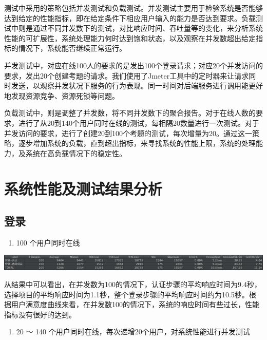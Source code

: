 \documentclass[hyperref, a4paper]{ctexart}
\providecommand{\tightlist}{%
  \setlength{\itemsep}{0pt}\setlength{\parskip}{0pt}}
\begin{document}
测试中采用的策略包括并发测试和负载测试。并发测试主要用于检验系统是否能够达到给定的性能指标，即在给定条件下相应用户输入的能力是否达到要求。负载测试中则是通过不同并发数下的测试，对比响应时间、吞吐量等的变化，来分析系统性能的可扩展性，系统处理能力何时达到饱和状态，以及观察在并发数超出给定指标的情况下，系统能否继续正常运行。

并发测试中，对应在线100人的要求的是发出100个登录请求；对应20个并发访问的要求，发出20个创建考题的请求。我们使用了Jmeter工具中的定时器来让请求同时发送，以观察并发状况下服务的行为表现。同一时间对后端服务进行调用能更好地发现资源竞争、资源死锁等问题。

负载测试中，则是调整了并发数，将不同并发数下的聚合报告。对于在线人数的要求，进行了从20到140个用户同时在线的测试，每相隔20数量进行一次测试。对于并发访问的要求，进行了创建20到100个考题的测试，每次增量为20。通过这一策略，逐步增加系统的负载，直到超出指标，来寻找系统的性能上限，系统的处理能力，及系统在高负载情况下的稳定性。

\hypertarget{ux7cfbux7edfux6027ux80fdux53caux6d4bux8bd5ux7ed3ux679cux5206ux6790}{%
\section{系统性能及测试结果分析}\label{ux7cfbux7edfux6027ux80fdux53caux6d4bux8bd5ux7ed3ux679cux5206ux6790}}

\hypertarget{ux767bux5f55}{%
\subsection{登录}\label{ux767bux5f55}}

\begin{enumerate}
\def\labelenumi{\arabic{enumi}.}
\tightlist
\item
  100 个用户同时在线
\end{enumerate}

\includegraphics{resources/wcn/login_100.png}

从结果中可以看出，在并发数为100的情况下，认证步骤的平均响应时间为9.4秒，选择项目的平均响应时间为1.1秒，整个登录步骤的平均响应时间约为10.5秒。根据用户满意度曲线来看，在并发数100的情况下，系统的响应时间有些过长，性能指标没有很好的达到。

\begin{enumerate}
\def\labelenumi{\arabic{enumi}.}
\setcounter{enumi}{1}
\tightlist
\item
  20 ～ 140 个用户同时在线，每次递增20个用户，对系统性能进行并发测试
\end{enumerate}
\end{document}
